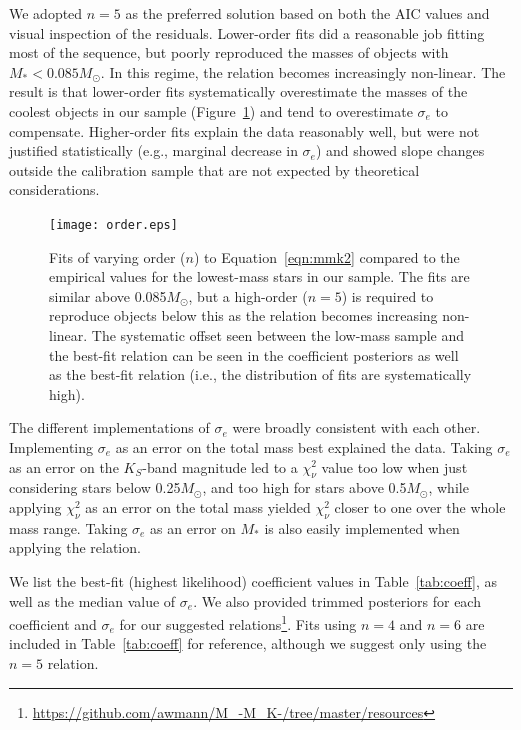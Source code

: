 \documentclass[twocolumn]{aastex62}
\newcommand{\order}{5}
\begin{document}
We adopted $n=\order$ as the preferred solution based on both the AIC values and visual inspection of the residuals. Lower-order fits did a reasonable job fitting most of the sequence, but poorly reproduced the masses of objects with $M_*<0.085M_\odot$. In this regime, the relation becomes increasingly non-linear. The result is that lower-order fits systematically overestimate the masses of the coolest objects in our sample (Figure~\ref{fig:order}) and tend to overestimate $\sigma_e$ to compensate. Higher-order fits explain the data reasonably well, but were not justified statistically (e.g., marginal decrease in $\sigma_e$) and showed slope changes outside the calibration sample that are not expected by theoretical considerations. 

\begin{figure}[h]
\begin{center}
\texttt{[image: order.eps]}
\caption{Fits of varying order ($n$) to Equation~\ref{eqn:mmk2} compared to the empirical values for the lowest-mass stars in our sample. The fits are similar above 0.085$M_\odot$, but a high-order ($n=\order$) is required to reproduce objects below this as the relation becomes increasing non-linear. The systematic offset seen between the low-mass sample and the best-fit relation can be seen in the coefficient posteriors as well as the best-fit relation (i.e., the distribution of fits are systematically high). }
\label{fig:order}
\end{center}
\end{figure}

The different implementations of $\sigma_e$ were broadly consistent with each other. Implementing $\sigma_e$ as an error on the total mass best explained the data. Taking $\sigma_e$ as an error on the $K_S$-band magnitude led to a $\chi^2_\nu$ value too low when just considering stars below 0.25$M_\odot$, and too high for stars above 0.5$M_\odot$, while applying $\chi^2_\nu$ as an error on the total mass yielded $\chi^2_\nu$ closer to one over the whole mass range. Taking $\sigma_e$ as an error on $M_*$ is also easily implemented when applying the relation. 

We list the best-fit (highest likelihood) coefficient values in Table~\ref{tab:coeff}, as well as the median value of $\sigma_e$. We also provided trimmed posteriors for each coefficient and $\sigma_e$ for our suggested relations\footnote{\href{https://github.com/awmann/M_-M_K-/tree/master/resources}{https://github.com/awmann/M\_-M\_K-/tree/master/resources}}. Fits using $n=4$ and $n=6$ are included in Table~\ref{tab:coeff} for reference, although we suggest only using the $n=\order$ relation. 
\end{document}
